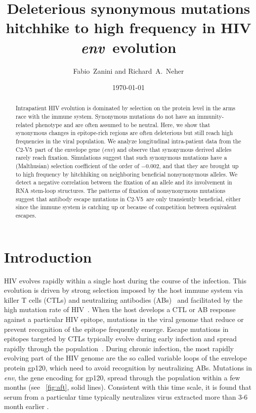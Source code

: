 \documentclass[rmp, twocolumn]{revtex4}
\newcommand{\env}{\textit{env}}
\newcommand{\shankaregion}{C2-V5}
\newcommand{\Author}{Fabio~Zanini and Richard~A.~Neher}
\newcommand{\Title}{Deleterious synonymous mutations hitchhike to high frequency in HIV \env~evolution}
\begin{document}
\title{\Title}
\author{\Author}
\date{\today}

\begin{abstract}
\noindent

Intrapatient HIV evolution is dominated by selection on the protein level in the
arms race with the immune system. Synonymous mutations do not have an
immunity-related phenotype and are often assumed to be neutral. Here, we show
that synonymous changes in epitope-rich regions are often deleterious but still
reach high frequencies in the viral population.
We analyze longitudinal intra-patient data from the \shankaregion~part of the
envelope gene (\env) and observe that synonymous derived alleles rarely reach
fixation.
Simulations suggest that such synonymous mutations have a (Malthusian) selection
coefficient of the order of $-0.002$, and that they are brought up to high
frequency by hitchhiking on neighboring beneficial nonsynonymous alleles. We
detect a negative correlation between the fixation of an allele and its
involvement in RNA stem-loop structures.
The patterns of fixation of nonsynonymous mutations suggest that antibody
escape mutations in \shankaregion~are only transiently beneficial, either since
the immune system is catching up or because of competition between equivalent
escapes.

\end{abstract}
\maketitle

\section{Introduction}

HIV evolves rapidly within a single host during the course of the infection.
This evolution is driven by strong selection imposed by the host immune system
via killer T cells (CTLs) and neutralizing antibodies
(ABs)~\citep{rambaut_causes_2004} and facilitated by the high
mutation rate of HIV~\citep{mansky_lower_1995,abram_nature_2010}. When the host
develops a CTL or AB response against a particular HIV epitope, mutations in the viral genome that
reduce or prevent recognition of the epitope frequently emerge. Escape mutations
in epitopes targeted by CTLs typically evolve during early infection and spread
rapidly through the population~\citep{mcmichael_immune_2009}. During chronic
infection, the most rapidly evolving part of the HIV genome are the so called
variable loops of the envelope protein gp120, which need to avoid recognition by
neutralizing ABs.  Mutations in \env, the gene encoding for gp120, spread
through the population within a few months (see \figurename~\ref{fig:aft}, solid
lines). Consistent with this time scale, it is found that serum from a
particular time typically neutralizes virus extracted more than 3-6 month
earlier \citep{richman_rapid_2003}.
\end{document}
